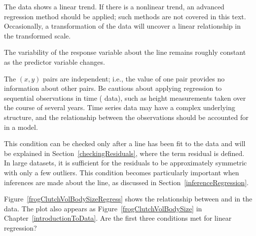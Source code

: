 


\begin{description}
\setlength{\itemsep}{0mm}
\item[1 Linearity.] The data shows a linear trend. If there is a nonlinear trend, an advanced regression method should be applied; such methods are not covered in this text.  Occasionally, a transformation of the data will uncover a linear relationship in the transformed scale.
\item[2 Constant variability.] The variability of the response variable about the line remains roughly constant as the predictor variable changes.
\item[3 Independent observations.]  The $(x,y)$ pairs are independent; i.e., the value of one pair provides no information about other pairs. Be cautious about applying regression to sequential observations in time ( data), such as height measurements taken over the course of several years. Time series data may have a complex underlying structure, and the relationship between the observations should be accounted for in a model. 
\item[4 Residuals that are approximately normally distributed.] This condition can be checked only after a line has been fit to the data and will be explained in Section~\ref{checkingResiduals}, where the term residual is defined. In large datasets, it is sufficient for the residuals to be approximately symmetric with only a few outliers. This condition becomes particularly important when inferences are made about the line, as discussed in Section~\ref{inferenceRegression}.  
\end{description}

\begin{exercisewrap}
\begin{nexercise}\label{nonConstantVariance}%
Figure~\ref{frogClutchVolBodySizeRegress} shows the relationship between  and  in the  data.  The plot also appears as Figure~\ref{frogClutchVolBodySize} in Chapter~\ref{introductionToData}. Are the first three conditions met for linear regression?\footnotemark{}
\end{nexercise}
\end{exercisewrap}

